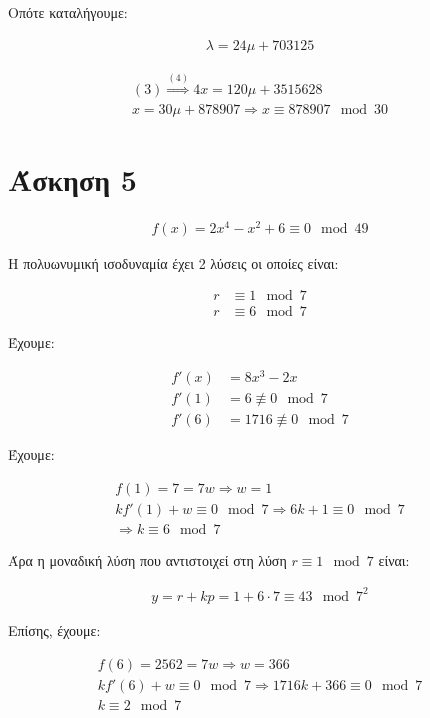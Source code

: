 \documentclass[11pt, oneside]{article}   	%
\begin{document}
Οπότε καταλήγουμε:

\begin{align}
	\lambda = 24\mu + 703125
\end{align}

\begin{align*}
	(3)\stackrel{(4)}{\Rightarrow} 4x = 120\mu + 3515628 \\
	x = 30\mu + 878907 \Rightarrow x \equiv 878907 \mod 30
\end{align*}

\section{Άσκηση 5}

\begin{align*}
	f(x)=2x^4-x^2+6 \equiv 0 \mod 49
\end{align*}

Η πολυωνυμική ισοδυναμία έχει 2 λύσεις οι οποίες είναι:

\begin{align*}
	r &\equiv 1 \mod 7 \\
	r &\equiv 6 \mod 7
\end{align*}

Έχουμε:

\begin{align*}
	f'(x) &= 8x^3 -2x \\
	f'(1) &= 6 \not\equiv 0 \mod 7 \\
	f'(6) &= 1716 \not\equiv 0 \mod 7
\end{align*}

Έχουμε:

\begin{align*}
	f(1) = 7=7w \Rightarrow w=1 \\
	kf'(1)+w \equiv 0 \mod 7 \Rightarrow 6k+1 \equiv 0 \mod 7 \\
	\Rightarrow k \equiv 6 \mod 7
\end{align*}

Άρα η μοναδική λύση που αντιστοιχεί στη λύση $r \equiv 1 \mod 7$ είναι:

\begin{align*}
	y = r + kp = 1 + 6 \cdot7 \equiv 43 \mod 7^2
\end{align*}

Επίσης, έχουμε:

\begin{align*}
	f(6) = 2562 = 7w \Rightarrow w = 366 \\
	kf'(6)+w \equiv 0 \mod 7 \Rightarrow 1716k + 366 \equiv 0 \mod 7 \\
	k \equiv 2 \mod 7
\end{align*}
\end{document}
